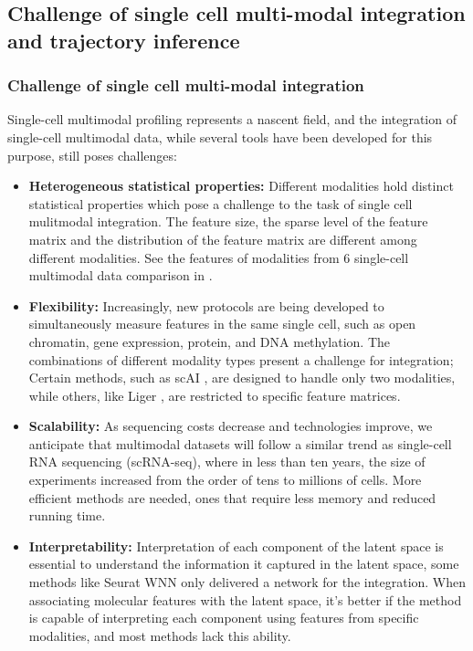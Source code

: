 \subsection{Challenge of single cell multi-modal integration and trajectory inference}
\label{background:sec2:challenge}

\subsubsection{Challenge of single cell multi-modal integration}
\label{background:sec2:challenge_integration}
Single-cell multimodal profiling represents a nascent field, and the integration of single-cell multimodal data, while several tools have been developed for this purpose, still poses challenges:

\begin{itemize}
	\item \textbf{Heterogeneous statistical properties:}
	 Different modalities hold distinct statistical properties which pose a challenge to the task of single cell mulitmodal integration. The feature size, the sparse level of the feature matrix and the distribution of the feature matrix are different among different modalities. See the features of modalities from 6 single-cell multimodal data comparison in .

	\item \textbf{Flexibility:}
	Increasingly, new protocols are being developed to simultaneously measure features in the same single cell, such as open chromatin, gene expression, protein, and DNA methylation. The combinations of different modality types present a challenge for integration; Certain methods, such as scAI \cite{jin2020scai}, are designed to handle only two modalities, while others, like Liger \citep{kriebel2022uinmf}, are restricted to specific feature matrices.

	\item \textbf{Scalability:} 
	As sequencing costs decrease and technologies improve, we anticipate that multimodal datasets will follow a similar trend as single-cell RNA sequencing (scRNA-seq), where in less than ten years, the size of experiments increased from the order of tens to millions of cells\citep{svensson2018exponential}. More efficient methods are needed, ones that require less memory and reduced running time.

	\item \textbf{Interpretability:}
	Interpretation of each component of the latent space is essential to understand the information it captured in the latent space, some methods like Seurat WNN \citep{hao2021seurat4} only delivered a network for the integration. When associating molecular features with the latent space, it's better if the method is capable of interpreting each component using features from specific modalities, and most methods lack this ability.


\end{itemize}
